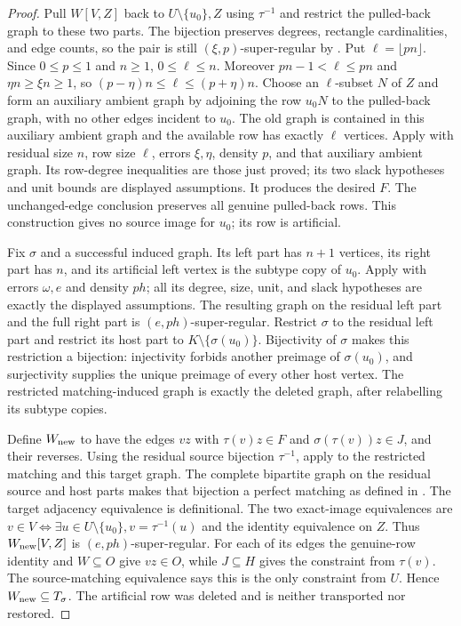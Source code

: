 \begin{proof}
Pull $W[V,Z]$ back to $U\setminus\{u_0\},Z$ using $\tau^{-1}$ and
restrict the pulled-back graph to these two parts. The bijection preserves
degrees, rectangle cardinalities, and edge counts, so the pair is still
$(\xi,p)$-super-regular by .
Put $\ell=\lfloor pn\rfloor$. Since $0\le p\le1$ and $n\ge1$,
$0\le\ell\le n$. Moreover $pn-1<\ell\le pn$ and
$\eta n\ge\xi n\ge1$, so
$(p-\eta)n\le\ell\le(p+\eta)n$.
Choose an $\ell$-subset $N$ of $Z$ and form an auxiliary ambient graph
by adjoining the row $u_0N$ to the pulled-back graph, with no other
edges incident to $u_0$. The old graph is contained in this auxiliary
ambient graph and the available row has exactly $\ell$ vertices.
Apply  with residual size $n$,
row size $\ell$, errors $\xi,\eta$, density $p$, and that auxiliary
ambient graph. Its row-degree inequalities are those just proved; its
two slack hypotheses and unit bounds are displayed assumptions.
It produces the desired $F$. The unchanged-edge conclusion preserves
all genuine pulled-back rows. This construction gives no source image
for $u_0$; its row is artificial.

Fix $\sigma$ and a successful induced graph. Its left part has $n+1$
vertices, its right part has $n$, and its artificial left vertex is the
subtype copy of $u_0$. Apply
 with errors $\omega,e$ and
density $ph$; all its degree, size, unit, and slack hypotheses are exactly
the displayed assumptions. The resulting graph on the residual left
part and the full right part is $(e,ph)$-super-regular.
Restrict $\sigma$ to the residual left part and restrict its host part
to $K\setminus\{\sigma(u_0)\}$. Bijectivity of $\sigma$ makes this
restriction a bijection: injectivity forbids another preimage of
$\sigma(u_0)$, and surjectivity supplies the unique preimage of every
other host vertex. The restricted matching-induced graph is exactly the
deleted graph, after relabelling its subtype copies.

Define $W_{\rm new}$ to have the edges $vz$ with
$\tau(v)z\in F$ and $\sigma(\tau(v))z\in J$, and their reverses.
Using the residual source bijection $\tau^{-1}$, apply
 to the restricted
matching and this target graph. The complete bipartite graph on the
residual source and host parts makes that bijection a perfect matching
as defined in . The target adjacency
equivalence is definitional. The two exact-image equivalences are
$v\in V\Longleftrightarrow\exists u\in U\setminus\{u_0\},
v=\tau^{-1}(u)$ and the identity equivalence on $Z$.
Thus $W_{\rm new}[V,Z]$ is $(e,ph)$-super-regular.
For each of its edges the genuine-row identity and $W\subseteq O$
give $vz\in O$, while $J\subseteq H$ gives the constraint from
$\tau(v)$. The source-matching equivalence says this is the only
constraint from $U$. Hence $W_{\rm new}\subseteq T_\sigma$.
The artificial row was deleted and is neither transported nor restored.
\end{proof}
